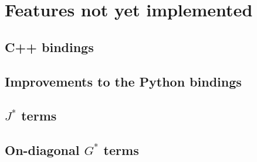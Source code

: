 \chapter{Features not yet implemented}
\section{C++ bindings}
\section{Improvements to the Python bindings}
\section{$J^*$ terms}
\section{On-diagonal $G^*$ terms}
